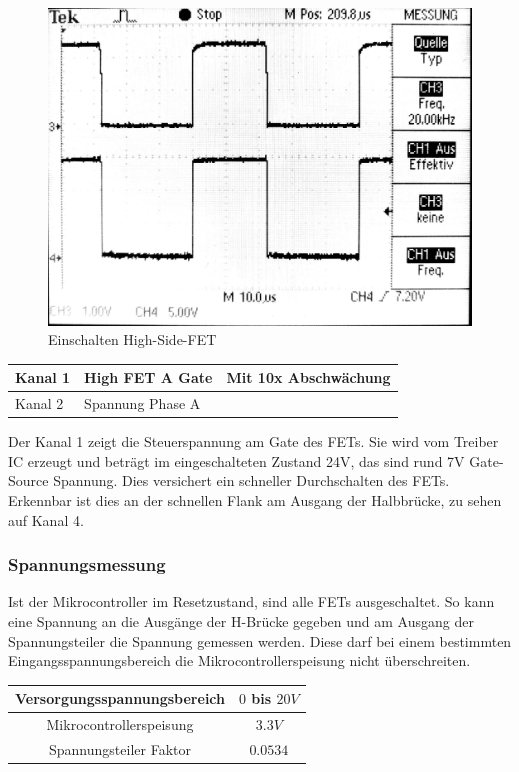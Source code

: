 \begin{figure} [H]
	\centering
	\includegraphics[width=0.5\linewidth]{images/valmcfet.jpg}
	\caption{Einschalten High-Side-FET}
	\label{fig:hsfet}
\end{figure}
\begin{center}
	\begin{tabular}{|l|l|l|}
		\hline 
		Kanal 1 & High FET A Gate & Mit 10x Abschwächung\\ \hline
		Kanal 2 & Spannung Phase A & {}\\ \hline
	\end{tabular}
\end{center}

Der Kanal 1 zeigt die Steuerspannung am Gate des FETs. Sie wird vom Treiber IC erzeugt und beträgt im eingeschalteten Zustand 24V, das sind rund 7V Gate-Source Spannung. Dies versichert ein schneller Durchschalten des FETs. Erkennbar ist dies an der schnellen Flank am Ausgang der Halbbrücke, zu sehen auf Kanal 4.

\subsubsection*{Spannungsmessung}
Ist der Mikrocontroller im Resetzustand, sind alle FETs ausgeschaltet. So kann eine Spannung an die Ausgänge der H-Brücke gegeben und am Ausgang der Spannungsteiler die Spannung gemessen werden. Diese darf bei einem bestimmten Eingangsspannungsbereich die Mikrocontrollerspeisung nicht überschreiten.

\begin{center}
	\begin{tabular}{|c|c|}
		\hline 
		Versorgungsspannungsbereich & $0$ bis $20V$ \\ \hline
		Mikrocontrollerspeisung & $3.3V$ \\ \hline
		Spannungsteiler Faktor & $0.0534$ \\ \hline
	\end{tabular} 
	\label{tab:vmessbed}
\end{center}


